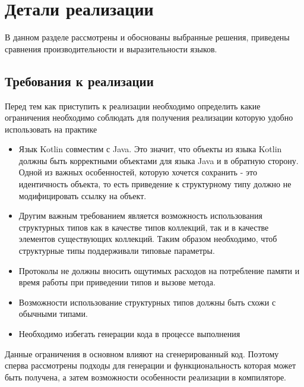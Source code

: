 \section{Детали реализации}
В данном разделе рассмотрены и обоснованы выбранные решения, приведены сравнения производительности и выразительности языков.

\subsection{Требования к реализации}
Перед тем как приступить к реализации необходимо определить какие ограничения необходимо соблюдать для получения реализации которую удобно использовать на практике

\begin{itemize}
\item Язык Kotlin совместим с Java. Это значит, что объекты из языка Kotlin должны быть корректными объектами для языка Java и в обратную сторону. Одной из важных особенностей, которую хочется сохранить - это идентичность объекта, то есть приведение к структурному типу должно не модифицировать ссылку на объект.
\item Другим важным требованием является возможность использования структурных типов как в качестве типов коллекций, так и в качестве элементов существующих коллекций. Таким образом необходимо, чтоб структурные типы поддерживали типовые параметры.
\item Протоколы не должны вносить ощутимых расходов на потребление памяти и время работы при приведении типов и вызове метода.
\item Возможности использование структурных типов должны быть схожи с обычными типами.
\item Необходимо избегать генерации кода в процессе выполнения
\end{itemize}

Данные ограничения в основном влияют на сгенерированный код. Поэтому сперва рассмотрены подходы для генерации и функциональность которая может быть получена, а затем возможности особенности реализации в компиляторе.



